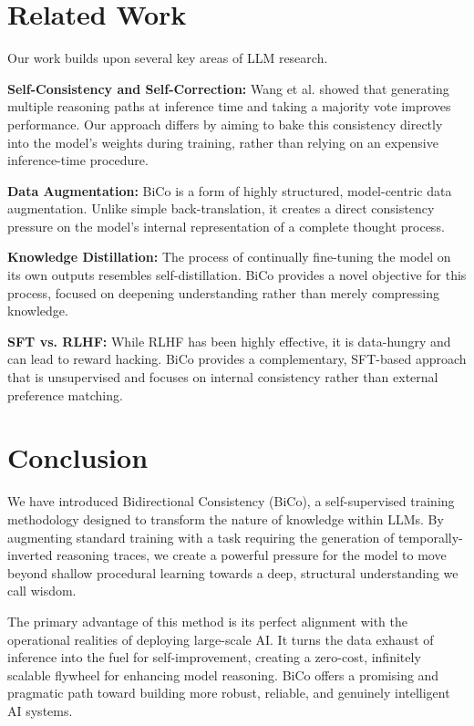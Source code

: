 \documentclass[11pt]{article}
\begin{document}
\section{Related Work}
Our work builds upon several key areas of LLM research.

\textbf{Self-Consistency and Self-Correction:} Wang et al. \cite{wang2022self} showed that generating multiple reasoning paths at inference time and taking a majority vote improves performance. Our approach differs by aiming to bake this consistency directly into the model's weights during training, rather than relying on an expensive inference-time procedure.

\textbf{Data Augmentation:} BiCo is a form of highly structured, model-centric data augmentation. Unlike simple back-translation, it creates a direct consistency pressure on the model's internal representation of a complete thought process.

\textbf{Knowledge Distillation:} The process of continually fine-tuning the model on its own outputs resembles self-distillation. BiCo provides a novel objective for this process, focused on deepening understanding rather than merely compressing knowledge.

\textbf{SFT vs. RLHF:} While RLHF \cite{ouyang2022training} has been highly effective, it is data-hungry and can lead to reward hacking. BiCo provides a complementary, SFT-based approach that is unsupervised and focuses on internal consistency rather than external preference matching.

\section{Conclusion}
We have introduced Bidirectional Consistency (BiCo), a self-supervised training methodology designed to transform the nature of knowledge within LLMs. By augmenting standard training with a task requiring the generation of temporally-inverted reasoning traces, we create a powerful pressure for the model to move beyond shallow procedural learning towards a deep, structural understanding we call wisdom.

The primary advantage of this method is its perfect alignment with the operational realities of deploying large-scale AI. It turns the data exhaust of inference into the fuel for self-improvement, creating a zero-cost, infinitely scalable flywheel for enhancing model reasoning. BiCo offers a promising and pragmatic path toward building more robust, reliable, and genuinely intelligent AI systems.
\end{document}
